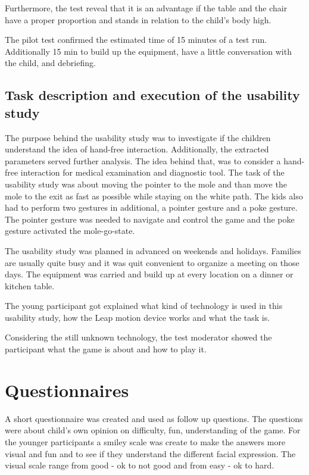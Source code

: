 Furthermore, the test reveal that it is an advantage if the table and the chair have a proper proportion and stands  in relation to the child's body high.

 
The pilot test confirmed the estimated time of 15 minutes of a test run. Additionally 15 min to build up the equipment, have a little conversation with the child, and debriefing.

\subsection{Task description and execution of the usability study}

The purpose behind the usability study was to investigate if the children understand the idea of hand-free interaction. Additionally, the extracted parameters served further analysis. The idea behind that, was to consider a hand-free interaction for medical examination and diagnostic tool. The task of the usability study was about moving the pointer to the mole and than move the mole to the exit as fast as possible while staying on the white path.
The kids also had to perform two gestures in additional, a pointer gesture and a poke gesture. The pointer gesture was needed to navigate and control the game and the poke gesture activated the mole-go-state.

The usability study was planned in advanced on weekends and holidays. Families are usually quite busy and it was quit convenient to organize a meeting on those days.
The equipment was carried and build up at every location on a dinner or kitchen table.

The young participant got explained what kind of technology is used in this usability study, how the Leap motion device works and what the task is.

Considering the still unknown technology, the test moderator showed the participant what the game is about and how to play it. 




\section{Questionnaires}

A short questionnaire was created and used as follow up questions. The questions were about child's own opinion on difficulty, fun, understanding of the game. For the younger participants a smiley scale was create to make the answers more visual and fun and to see if they understand the different facial expression.
The visual scale range from  good - ok to not good and from easy - ok to hard.

